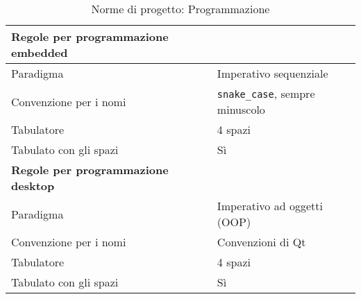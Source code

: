 \begin{table}[H] \centering
    \caption{Norme di progetto: Programmazione}
    \begin{tabularx}{\textwidth}{X l}
        \toprule
        \bfseries Regole per programmazione embedded & \\
        \midrule
        Paradigma & Imperativo sequenziale \\
        Convenzione per i nomi & \texttt{snake\_case}, sempre minuscolo \\
        Tabulatore & 4 spazi \\
        Tabulato con gli spazi & S\`i \\
        \midrule
        \bfseries Regole per programmazione desktop & \\
        \midrule
        Paradigma  & Imperativo ad oggetti (OOP) \\
        Convenzione per i nomi & Convenzioni di Qt \\
        Tabulatore & 4 spazi \\
        Tabulato con gli spazi & S\`i \\
        \bottomrule
    \end{tabularx}
\end{table}
